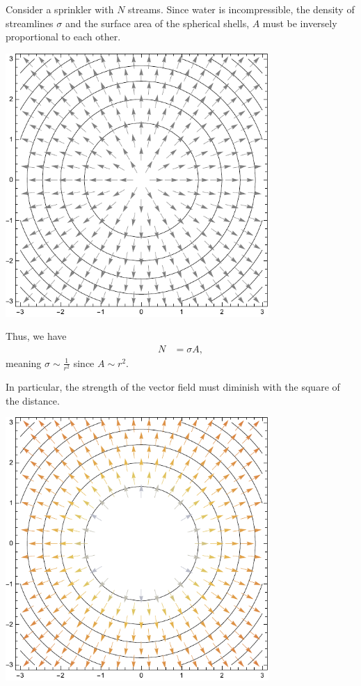 \documentclass[10pt]{mypackage}
\begin{document}
\begin{example}
  Consider a sprinkler with $N$ streams. Since water is incompressible, the density of streamlines $\sigma$ and the surface area of the spherical shells, $A$ must be inversely proportional to each other.
  \begin{center}
    \includegraphics[width=10cm]{images/shells_vector_field.pdf}
  \end{center}
  Thus, we have
  \begin{align*}
    N &=\sigma A,
  \end{align*}
  meaning $\sigma \sim \frac{1}{r^2}$ since $A\sim r^2$.\newline

  In particular, the strength of the vector field must diminish with the square of the distance.
  \begin{center}
    \includegraphics[width=10cm]{images/shells_vector_field_2.pdf}
  \end{center}
\end{example}
\end{document}
